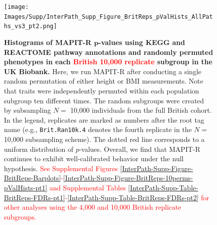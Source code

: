 \documentclass[10pt]{article}
\begin{document}
\begin{figure}[htbp]
\centering
\texttt{[image: Images/Supp/InterPath\_Supp\_Figure\_BritReps\_pValHists\_AllPaths\_vs3\_pt2.png]}
\caption{\textbf{Histograms of MAPIT-R $\bm{p}$-values using KEGG and REACTOME pathway annotations and randomly permuted phenotypes in each \textcolor{red}{British 10,000 replicate} subgroup in the UK Biobank.} Here, we run MAPIT-R after conducting a single random permutation of either height or BMI measurements. Note that traits were independently permuted within each population subgroup ten different times. The random subgroups were created by subsampling $N =$ 10,000 individuals from the full British cohort. In the legend, replicates are marked as numbers after the root tag name (e.g., \texttt{Brit.Ran10k.4} denotes the fourth replicate in the $N =$ 10,000 subsampling scheme). The dotted red line corresponds to a uniform distribution of $p$-values. Overall, we find that MAPIT-R continues to exhibit well-calibrated behavior under the null hypothesis. \textcolor{red}{See Supplemental Figures \ref{InterPath-Supp-Figure-BritReps-Barplots}-\ref{InterPath-Supp-Figure-BritReps-10perms-pValHists-pt1} and Supplemental Tables \ref{InterPath-Supp-Table-BritReps-FDRs-pt1}-\ref{InterPath-Supp-Table-BritReps-FDRs-pt2} for other analyses using the 4,000 and 10,000 British replicate subgroups.}}
\label{InterPath-Supp-Figure-BritReps-10perms-pValHists-pt2}
\end{figure}
\clearpage

\end{document}
